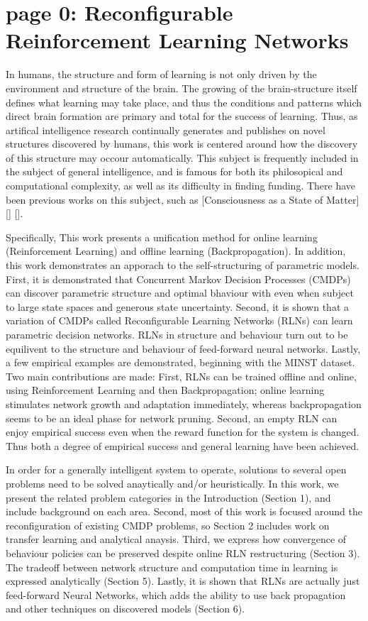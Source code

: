  

\section*{page 0: Reconfigurable Reinforcement Learning Networks}

In humans, the structure and form of learning is not only driven by the environment and structure of the brain. The growing of the brain-structure itself defines what learning may take place, and thus the conditions and patterns which direct brain formation are primary and total for the success of learning. Thus, as artifical intelligence research continually generates and publishes on novel structures discovered by humans, this work is centered around how the discovery of this structure may occour automatically. This subject is frequently included in the subject of general intelligence, and is famous for both its philosopical and computational complexity, as well as its difficulty in finding funding. There have been previous works on this subject, such as [Consciousness as a State of Matter] [] []. 

Specifically, This work presents a unification method for online learning (Reinforcement Learning) and offline learning (Backpropagation). In addition, this work demonstrates an apporach to the self-structuring of parametric models. First, it is demonstrated that Concurrent Markov Decision Processes (CMDPs) can discover parametric structure and optimal bhaviour with even when subject to large state spaces and generous state uncertainty. Second, it is shown that a variation of CMDPs called Reconfigurable Learning Networks (RLNs) can learn parametric decision networks. RLNs in structure and behaviour turn out to be equilivent to the structure and behaviour of feed-forward neural networks. Lastly, a few empirical examples are demonstrated, beginning with the MINST dataset. Two main contributions are made: First, RLNs can be trained offline and online, using Reinforcement Learning and then Backpropagation; online learning stimulates network growth and adaptation immediately, whereas backpropagation seems to be an ideal phase for network pruning.  Second, an empty RLN can enjoy empirical success even when the reward function for the system is changed. Thus both a degree of empirical success and general learning have been achieved.

In order for a generally intelligent system to operate, solutions to several open problems need to be solved anaytically and/or heuristically. In this work, we present the related problem categories in the Introduction (Section 1), and include background on each area. Second, most of this work is focused around the reconfiguration of existing CMDP problems, so Section 2 includes work on transfer learning and analytical anaysis. Third, we express how convergence of behaviour policies can be preserved despite online RLN restructuring (Section 3). The tradeoff between network structure and computation time  in learning is expressed analytically (Section 5). Lastly, it is shown that RLNs are actually just feed-forward Neural Networks, which adds the ability to use back propagation and other techniques on discovered models (Section 6).

